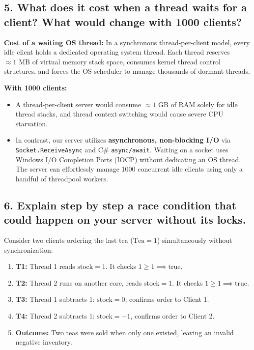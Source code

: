 \documentclass[12pt,a4paper]{article}
\begin{document}
\subsection{5. What does it cost when a thread waits for a client? What would change with 1000 clients?}
\textbf{Cost of a waiting OS thread:} In a synchronous thread-per-client model, every idle client holds a dedicated operating system thread. Each thread reserves $\approx 1\text{ MB}$ of virtual memory stack space, consumes kernel thread control structures, and forces the OS scheduler to manage thousands of dormant threads.

\textbf{With 1000 clients:}
\begin{itemize}
    \item A thread-per-client server would consume $\approx 1\text{ GB}$ of RAM solely for idle thread stacks, and thread context switching would cause severe CPU starvation.
    \item In contrast, our server utilizes \textbf{asynchronous, non-blocking I/O} via \texttt{Socket.ReceiveAsync} and C\# \texttt{async/await}. Waiting on a socket uses Windows I/O Completion Ports (IOCP) without dedicating an OS thread. The server can effortlessly manage 1000 concurrent idle clients using only a handful of threadpool workers.
\end{itemize}

\subsection{6. Explain step by step a race condition that could happen on your server without its locks.}
Consider two clients ordering the last tea ($\text{Tea} = 1$) simultaneously without synchronization:
\begin{enumerate}
    \item \textbf{T1:} Thread 1 reads $\text{stock} = 1$. It checks $1 \ge 1 \implies \text{true}$.
    \item \textbf{T2:} Thread 2 runs on another core, reads $\text{stock} = 1$. It checks $1 \ge 1 \implies \text{true}$.
    \item \textbf{T3:} Thread 1 subtracts 1: $\text{stock} = 0$, confirms order to Client 1.
    \item \textbf{T4:} Thread 2 subtracts 1: $\text{stock} = -1$, confirms order to Client 2.
    \item \textbf{Outcome:} Two teas were sold when only one existed, leaving an invalid negative inventory.
\end{enumerate}
\end{document}
